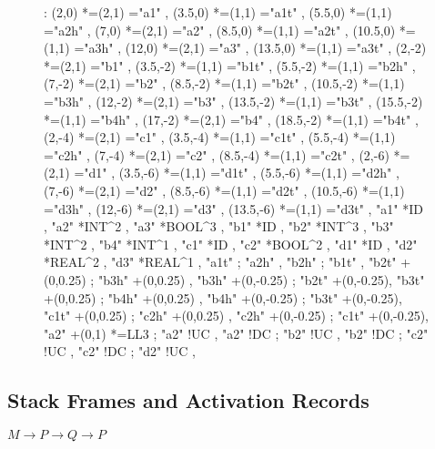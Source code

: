 \documentclass[a4paper,12pt]{article}
\begin{document}
\begin{figure}[h]

\xy<1cm,0cm>:
(2,0) *=(2,1)\frm{-}    ="a1" ,
(3.5,0) *=(1,1)\frm{-}  ="a1t" ,
(5.5,0) *=(1,1)\frm{-}    ="a2h" ,
(7,0) *=(2,1)\frm{-}  ="a2" ,
(8.5,0) *=(1,1)\frm{-}    ="a2t" ,
(10.5,0) *=(1,1)\frm{-} ="a3h" ,
(12,0) *=(2,1)\frm{-}   ="a3" ,
(13.5,0) *=(1,1)\frm{-} ="a3t" ,
%
(2,-2) *=(2,1)\frm{-}    ="b1" ,
(3.5,-2) *=(1,1)\frm{-}  ="b1t" ,
(5.5,-2) *=(1,1)\frm{-}    ="b2h" ,
(7,-2) *=(2,1)\frm{-}  ="b2" ,
(8.5,-2) *=(1,1)\frm{-}    ="b2t" ,
(10.5,-2) *=(1,1)\frm{-} ="b3h" ,
(12,-2) *=(2,1)\frm{-}   ="b3" ,
(13.5,-2) *=(1,1)\frm{-} ="b3t" ,
(15.5,-2) *=(1,1)\frm{-}   ="b4h" ,
(17,-2) *=(2,1)\frm{-} ="b4" ,
(18.5,-2) *=(1,1)\frm{-}   ="b4t" ,
%
(2,-4) *=(2,1)\frm{-}    ="c1" ,
(3.5,-4) *=(1,1)\frm{-}  ="c1t" ,
(5.5,-4) *=(1,1)\frm{-}    ="c2h" ,
(7,-4) *=(2,1)\frm{-}  ="c2" ,
(8.5,-4) *=(1,1)\frm{-}    ="c2t" ,
%
(2,-6) *=(2,1)\frm{-}    ="d1" ,
(3.5,-6) *=(1,1)\frm{-}  ="d1t" ,
(5.5,-6) *=(1,1)\frm{-}    ="d2h" ,
(7,-6) *=(2,1)\frm{-}  ="d2" ,
(8.5,-6) *=(1,1)\frm{-}    ="d2t" ,
(10.5,-6) *=(1,1)\frm{-} ="d3h" ,
(12,-6) *=(2,1)\frm{-}   ="d3" ,
(13.5,-6) *=(1,1)\frm{-} ="d3t" ,
%
\POS "a1" *{ID} ,
\POS "a2" *{INT^{2}} ,
\POS "a3" *{BOOL^{3}} ,
\POS "b1" *{ID} ,
\POS "b2" *{INT^{3}} ,
\POS "b3" *{INT^{2}} ,
\POS "b4" *{INT^{1}} ,
\POS "c1" *{ID} ,
\POS "c2" *{BOOL^{2}} ,
\POS "d1" *{ID} ,
\POS "d2" *{REAL^{2}} ,
\POS "d3" *{REAL^{1}} ,
%
\POS "a1t" \ar ; "a2h" ,
\POS "b2h" \ar ; "b1t" ,
\POS "b2t" +(0,0.25) \ar ; "b3h" +(0,0.25) ,
\POS "b3h" +(0,-0.25) \ar ; "b2t" +(0,-0.25),
\POS "b3t" +(0,0.25) \ar ; "b4h" +(0,0.25) ,
\POS "b4h" +(0,-0.25) \ar ; "b3t" +(0,-0.25),
\POS "c1t" +(0,0.25) \ar ; "c2h" +(0,0.25) ,
\POS "c2h" +(0,-0.25) \ar ; "c1t" +(0,-0.25),
%
\POS "a2" +(0,1) *={LL3} \ar ; "a2" !UC ,
\POS "a2" !DC \ar ; "b2" !UC ,
\POS "b2" !DC \ar ; "c2" !UC ,
\POS "c2" !DC \ar ; "d2" !UC ,
\endxy

\end{figure}

\subsection{Stack Frames and Activation Records}

$M \to P \to Q \to P$
\end{document}
